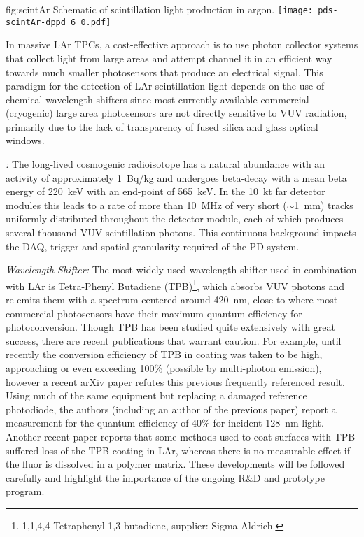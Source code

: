 \begin{dunefigure}{fig:scintAr}
{Schematic of scintillation light production in argon.}
\texttt{[image: pds-scintAr-dppd\_6\_0.pdf]}
\end{dunefigure}

In massive LAr TPCs, a cost-effective approach is to use photon collector systems that collect light from large areas and attempt channel it in an efficient way towards much smaller photosensors that produce an electrical signal.
This paradigm for the detection of LAr scintillation light depends on the use of chemical wavelength shifters since most currently available commercial (cryogenic) large area photosensors are not directly sensitive to VUV radiation, primarily due to the lack of transparency of fused silica and glass optical windows. 

\emph{:}  The long-lived cosmogenic radioisotope  has a natural abundance with an activity of approximately \SI{1}{Bq/kg} and
undergoes beta-decay with a mean beta energy of \SI{220}{keV} with an end-point of \SI{565}{keV}. In the \SI{10}{kt} far detector modules this leads to a rate of more than \SI{10}{MHz} of very short ($\sim$\SI{1}{mm}) tracks uniformly distributed throughout the detector module, each of which produces several thousand VUV scintillation photons. This continuous background impacts the DAQ, trigger and spatial granularity required of the PD system.

\emph{Wavelength Shifter:} The most widely used wavelength shifter used in combination with LAr is Tetra-Phenyl Butadiene (TPB)\footnote{1,1,4,4-Tetraphenyl-1,3-butadiene, supplier: Sigma-Aldrich\textregistered.}, which absorbs VUV photons and re-emits them with a spectrum centered around \SI{420}{nm}, close to where most commercial photosensors have their maximum quantum efficiency for photoconversion. 
Though TPB has been studied quite extensively with great success, there are recent publications that warrant caution. For example, until recently the conversion efficiency of TPB in coating was taken to be high, approaching or even exceeding 100\% (possible by multi-photon emission), however a recent arXiv paper\cite{Benson:2017vbw} refutes this previous frequently referenced result. Using much of the same equipment but replacing a damaged reference photodiode, the authors (including an author of the previous paper) report a measurement for the quantum efficiency of 40\% for incident \SI{128}{nm} light. 
Another recent paper\cite{Asaadi:2018ixs} reports that some methods used to coat surfaces with TPB suffered loss of the TPB coating in LAr, whereas there is no measurable effect if the fluor is dissolved in a polymer matrix. These developments will be followed carefully and highlight the importance of the ongoing R\&D and prototype program.


